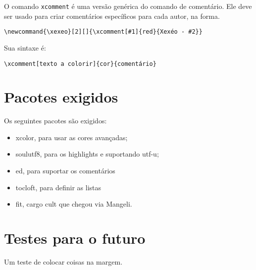 \documentclass{article}
\begin{document}
O comando \verb!xcomment! é uma versão genérica do comando de comentário. Ele deve ser usado para criar comentários específicos para cada autor, na forma.

\begin{verbatim}
\newcommand{\xexeo}[2][]{\xcomment[#1]{red}{Xexéo - #2}}
\end{verbatim}

Sua sintaxe é:
\begin{verbatim}
\xcomment[texto a colorir]{cor}{comentário}
\end{verbatim}

\section{Pacotes exigidos}

Os seguintes pacotes são exigidos:
\begin{itemize}
    \item xcolor, para usar as cores avançadas;
    \item soulutf8, para os highlights e suportando utf-u;
    \item ed, para suportar os comentários
    \item tocloft, para definir as listas 
    \item fit, cargo cult que chegou via Mangeli.
\end{itemize}

\section{Testes para o futuro}

Um teste de colocar coisas na margem.

\printbibliography


\newpage
\listofassunto
\newpage
\listofcomentario
\end{document}
